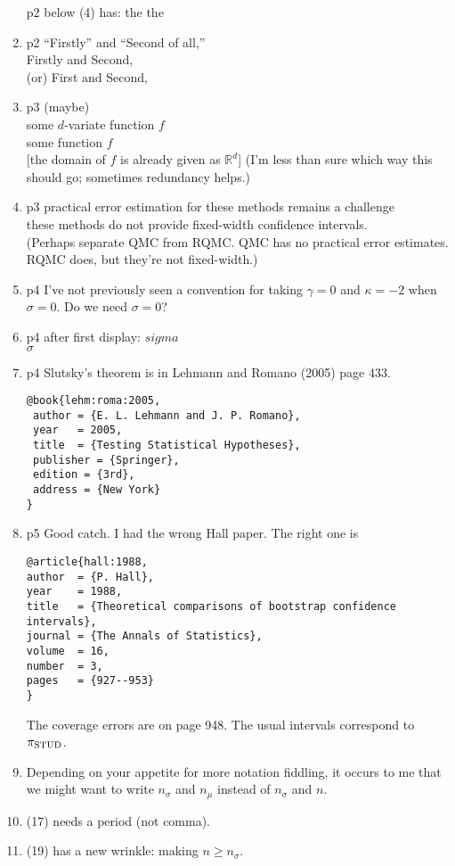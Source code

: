 \documentclass{article}
\newcommand{\real}{\mathbb{R}}
\begin{document}
\begin{enumerate}
p2 below (4) has: the the 
\item
p2
``Firstly'' and  ``Second of all,''\\
Firstly and Second,\\
(or) First and Second,
\item
p3 (maybe)\\
some $d$-variate function $f$\\
some function $f$\\
{}[the domain of $f$ is already
given as $\real^d$]
(I'm less than sure which way this should
go; sometimes redundancy helps.)
\item
p3
practical error estimation for these methods remains a challenge\\
these methods do not provide fixed-width confidence intervals.\\
(Perhaps separate QMC from RQMC.  QMC has no practical error
estimates. RQMC does, but they're not fixed-width.)
\item
p4
I've not previously seen a convention for taking $\gamma=0$
and $\kappa = -2$ when $\sigma = 0$. Do we need $\sigma=0$?
\item
p4 after first display: $sigma$\\
$\sigma$
\item
p4 Slutsky's theorem is in Lehmann and Romano (2005)
page 433.
\begin{verbatim}                  
@book{lehm:roma:2005,
 author = {E. L. Lehmann and J. P. Romano},
 year   = 2005,
 title  = {Testing Statistical Hypotheses},
 publisher = {Springer},
 edition = {3rd},
 address = {New York}
}
\end{verbatim}
\item
p5 Good catch. I had the wrong Hall paper.  The right one is
\begin{verbatim}
@article{hall:1988,
author  = {P. Hall},
year    = 1988,
title   = {Theoretical comparisons of bootstrap confidence intervals},
journal = {The Annals of Statistics},
volume  = 16,
number  = 3,
pages   = {927--953}
}
\end{verbatim}
The coverage errors are on page 948. The usual
intervals correspond to $\pi_{\rm{STUD}}$.
\item
Depending on your appetite for more notation fiddling,
it occurs to me that we might want to
write $n_\sigma$ and $n_\mu$ 
instead of $n_\sigma$ and $n$. 
\item
(17) needs a period (not comma).
\item
(19) has a new wrinkle: making $n\ge n_\sigma$.

\end{enumerate}
\end{document}

